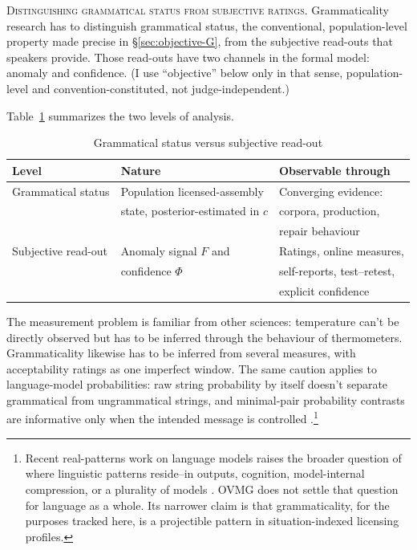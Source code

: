 \documentclass[12pt,letterpaper]{article}
\begin{document}
\noindent\textsc{Distinguishing grammatical status from subjective ratings.} Grammaticality research has to distinguish grammatical status, the conventional, population-level property made precise in \S\ref{sec:objective-G}, from the subjective read-outs that speakers provide. Those read-outs have two channels in the formal model: anomaly and confidence. (I use \enquote{objective} below only in that sense, population-level and convention-constituted, not judge-independent.)

Table~\ref{tab:two-levels} summarizes the two levels of analysis.

\begin{table}[h]
\centering
\caption{Grammatical status versus subjective read-out}
\label{tab:two-levels}
\begin{tabular}{@{}>{\raggedright\arraybackslash}p{}
  >{\raggedright\arraybackslash}p{}
  >{\raggedright\arraybackslash}p{}@{}}
\toprule
Level & Nature & Observable through\\
\midrule
Grammatical status & Population licensed-assembly & Converging evidence:\\
& state, posterior-estimated in $c$ & corpora, production,\\
& & repair behaviour\\[6pt]
Subjective read-out & Anomaly signal $F$ and & Ratings, online measures,\\
& confidence $\Phi$ & self-reports, test--retest,\\
& & explicit confidence\\
\bottomrule
\end{tabular}
\end{table}

The measurement problem is familiar from other sciences: temperature can't be directly observed but has to be inferred through the behaviour of thermometers. Grammaticality likewise has to be inferred from several measures, with acceptability ratings as one imperfect window. The same caution applies to language-model probabilities: raw string probability by itself doesn't separate grammatical from ungrammatical strings, and minimal-pair probability contrasts are informative only when the intended message is controlled \autocite{HuEtAl2026StringProbability}.\footnote{Recent real-patterns work on language models raises the broader question of where linguistic patterns reside--in outputs, cognition, model-internal compression, or a plurality of models \autocite{nefdtLadyman2026RealPatterns}. OVMG does not settle that question for language as a whole. Its narrower claim is that grammaticality, for the purposes tracked here, is a projectible pattern in situation-indexed licensing profiles.}
\end{document}
